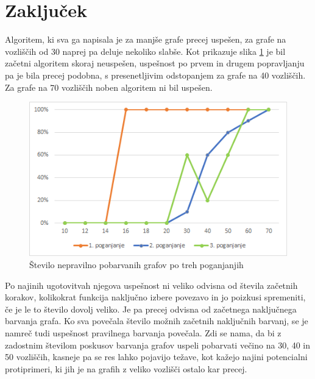 \documentclass[12pt, a4paper]{article}
\begin{document}
\newpage
\section{Zaključek}
Algoritem, ki sva ga napisala je za manjše grafe precej uspešen, za grafe na vozliščih od 30 naprej pa deluje nekoliko slabše. Kot prikazuje slika \ref{fig:nepravilni_konec} je bil začetni algoritem skoraj neuspešen, uspešnost po prvem in drugem popravljanju pa je bila precej podobna, s presenetljivim odstopanjem za grafe na 40 vozliščih. Za grafe na 70 vozliščih noben algoritem ni bil uspešen.

\begin{figure}[H]
  \includegraphics[width=\linewidth]{stevilo_nepravilnih_3_poganjanja.png}
  \caption{Število nepravilno pobarvanih grafov po treh poganjanjih}
  \label{fig:nepravilni_konec}
\end{figure}


Po najinih ugotovitvah njegova uspešnost ni veliko odvisna od števila začetnih korakov, kolikokrat funkcija naključno izbere povezavo in jo poizkusi spremeniti, če je le to število dovolj veliko. Je pa precej odvisna od začetnega naključnega barvanja grafa. Ko sva povečala število možnih začetnih naključnih barvanj, se je namreč tudi uspešnost pravilnega barvanja povečala. Zdi se nama, da bi z zadostnim številom poskusov barvanja grafov uspeli pobarvati večino na 30, 40 in 50 vozliščih, kasneje pa se res lahko pojavijo težave, kot kažejo najini potencialni protiprimeri, ki jih je na grafih z veliko vozlišči ostalo kar precej.
\end{document}
